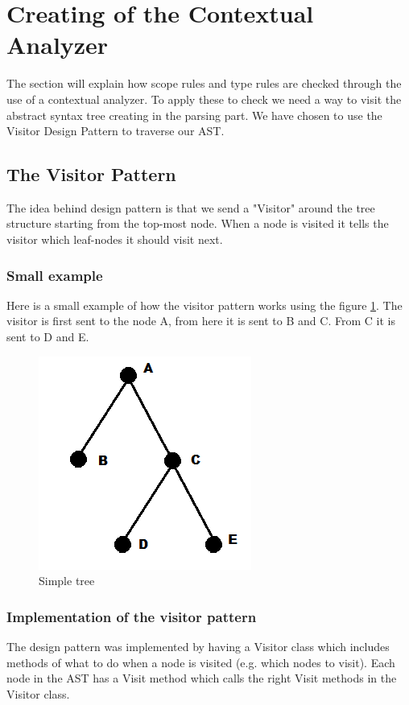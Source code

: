 \section{Creating of the Contextual Analyzer}
	The section will explain how scope rules and type rules are checked through the use of a contextual analyzer.
	To apply these to check we need a way to visit the abstract syntax tree creating in the parsing part. We have chosen to use 
	the Visitor Design Pattern to traverse our AST.
	
	\subsection{The Visitor Pattern}
		The idea behind design pattern is that we send a "Visitor" around the tree structure starting from the top-most node. When a node is 
		visited it tells the visitor which leaf-nodes it should visit next. \\
		
		\subsubsection*{Small example}
			Here is a small example of how the visitor pattern works using the figure \ref{fig:simpletree}. 
			The visitor is first sent to the node A, from here it is sent to B and C. From C it is sent to D and E.
		
			\begin{figure}
				\centering
				\includegraphics{rapport/6/figures/simpletree}
				\caption{Simple tree} \label{fig:simpletree}
			\end{figure}
			
		\subsubsection{Implementation of the visitor pattern}
			The design pattern was implemented by having a Visitor class which includes methods of what to do when a node is visited 
			(e.g. which nodes to visit). Each node in the AST has a Visit method which calls the right Visit methods in the Visitor class. \\
	
